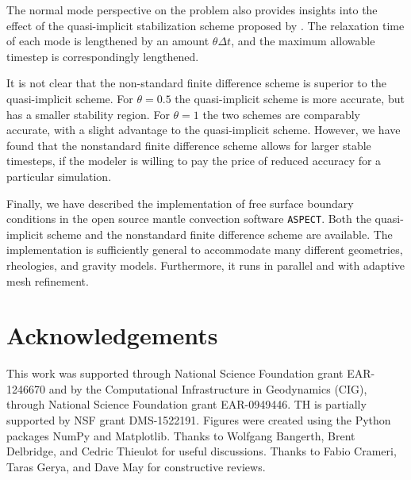 \documentclass[preprint,12pt,authoryear]{elsarticle}
\begin{document}
The normal mode perspective on the problem also provides insights into the effect of 
the quasi-implicit stabilization scheme proposed by \citet{kaus2010stabilization}.
The relaxation time of each mode is lengthened by an amount $\theta \Delta t$, and the
maximum allowable timestep is correspondingly lengthened.

It is not clear that the non-standard finite difference scheme is superior to 
the quasi-implicit scheme. For $\theta=0.5$ the quasi-implicit scheme is more accurate,
but has a smaller stability region. For $\theta=1$ the two schemes are comparably accurate,
with a slight advantage to the quasi-implicit scheme. However, we have found that
the nonstandard finite difference scheme allows for larger stable timesteps, if the modeler 
is willing to pay the price of reduced accuracy for a particular simulation.

Finally, we have described the implementation of free surface boundary conditions in 
the open source mantle convection software \texttt{ASPECT}. Both the quasi-implicit 
scheme and the nonstandard finite difference scheme are available. The implementation is 
sufficiently general to accommodate many different geometries, rheologies, and 
gravity models. Furthermore, it runs in parallel and with adaptive mesh refinement.


\section*{Acknowledgements}
This work was supported through National Science Foundation grant EAR-1246670
and by the Computational Infrastructure in Geodynamics (CIG), through National Science Foundation grant EAR-0949446. 
TH is partially supported by NSF grant DMS-1522191.
Figures were created using the Python packages NumPy and Matplotlib.
Thanks to Wolfgang Bangerth, Brent Delbridge, and Cedric Thieulot for useful discussions.
Thanks to Fabio Crameri, Taras Gerya, and Dave May for constructive reviews.



\end{document}
